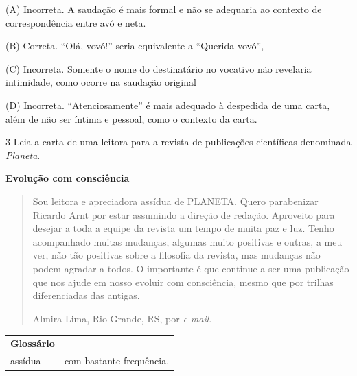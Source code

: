 \begin{escolha}

(A) Incorreta. A saudação é mais formal e não se adequaria ao contexto
de correspondência entre avó e neta.

(B) Correta. ``Olá, vovó!'' seria equivalente a ``Querida vovó'',

(C) Incorreta. Somente o nome do destinatário no vocativo não revelaria
intimidade, como ocorre na saudação original

(D) Incorreta. ``Atenciosamente'' é mais adequado à despedida de uma
carta, além de não ser íntima e pessoal, como o contexto da carta.

\num{3} Leia a carta de uma leitora para a revista de publicações
científicas denominada \textit{Planeta}.


\textbf{Evolução com consciência}

\begin{quote}
Sou leitora e apreciadora assídua de PLANETA. Quero parabenizar Ricardo
Arnt por estar assumindo a direção de redação. Aproveito para desejar a
toda a equipe da revista um tempo de muita paz e luz. Tenho acompanhado
muitas mudanças, algumas muito positivas e outras, a meu ver, não tão
positivas sobre a filosofia da revista, mas mudanças não podem agradar a
todos. O importante é que continue a ser uma publicação que nos ajude em
nosso evoluir com consciência, mesmo que por trilhas diferenciadas das
antigas.

\begin{flushright}
Almira Lima, Rio Grande, RS, por \emph{e-mail}.
\end{flushright}
\end{quote}


\begin{tabular}{ll}
\textbf{Glossário} & \mbox{}\\
assídua & com bastante frequência.\\
\end{tabular}


\end{escolha}
